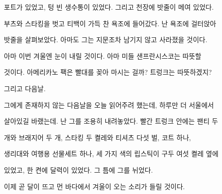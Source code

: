 포트가 있었고, 텅 빈 생수통이 있었다. 그리고 천장에 밧줄이 메여 있었다.



부츠와 스타킹을 벗고 티백이 가득 찬 욕조에 들어갔다. 난 욕조에 걸터앉아

밧줄을 살펴보았다. 아마도 그는 지문조차 남기지 않고 사라졌을 것이다.

아마 이번 겨울엔 눈이 내릴 것이다. 아마 미들 샌프란시스코는 따뜻할

것이다. 아메리카노 팩은 빨대를 꽂아 마시는 걸까? 트렁크는 따뜻하겠지?

그리고 다음날.



그에게 존재하지 않는 다음날을 오늘 읽어주려 했는데, 하루만 더 서울에서

살아있길 바랬는데. 난 그를 조용히 내려놓았다. 빨간 트렁크 안에는 팬티 두

개와 브래지어 두 개, 스타킹 두 켤레와 티셔츠 다섯 벌, 코트 하나,

생리대와 여행용 선물세트 하나, 세 가지 색의 립스틱이 구두 여섯 켤레 옆에

있었고, 한 켠에 달력이 있었다. 그 틈에 그를 뉘었다.



이제 곧 달이 뜨고 먼 바다에서 겨울이 오는 소리가 들릴 것이다.

